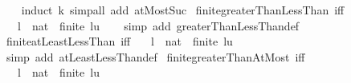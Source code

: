\begin{isabellebody}
%
\isadelimproof
\ \ %
\endisadelimproof
%
\isatagproof
{}\isamarkupfalse%
\ {\isacharparenleft}{\kern0pt}induct\ k{\isacharparenright}{\kern0pt}\ {\isacharparenleft}{\kern0pt}simp{\isacharunderscore}{\kern0pt}all\ add{\isacharcolon}{\kern0pt}\ atMost{\isacharunderscore}{\kern0pt}Suc{\isacharparenright}{\kern0pt}%
\endisatagproof
{\isafoldproof}%
%
\isadelimproof
\isanewline
%
\endisadelimproof
\isanewline
{}\isamarkupfalse%
\ finite{\isacharunderscore}{\kern0pt}greaterThanLessThan\ {\isacharbrackleft}{\kern0pt}iff{\isacharbrackright}{\kern0pt}{\isacharcolon}{\kern0pt}\isanewline
\ \ \ l\ {\isacharcolon}{\kern0pt}{\isacharcolon}{\kern0pt}\ nat\ \ {\isachardoublequoteopen}finite\ {\isacharbraceleft}{\kern0pt}l{\isacharless}{\kern0pt}{\isachardot}{\kern0pt}{\isachardot}{\kern0pt}{\isacharless}{\kern0pt}u{\isacharbraceright}{\kern0pt}{\isachardoublequoteclose}\isanewline
%
\isadelimproof
\ \ %
\endisadelimproof
%
\isatagproof
{}\isamarkupfalse%
\ {\isacharparenleft}{\kern0pt}simp\ add{\isacharcolon}{\kern0pt}\ greaterThanLessThan{\isacharunderscore}{\kern0pt}def{\isacharparenright}{\kern0pt}%
\endisatagproof
{\isafoldproof}%
%
\isadelimproof
\isanewline
%
\endisadelimproof
\isanewline
{}\isamarkupfalse%
\ finite{\isacharunderscore}{\kern0pt}atLeastLessThan\ {\isacharbrackleft}{\kern0pt}iff{\isacharbrackright}{\kern0pt}{\isacharcolon}{\kern0pt}\isanewline
\ \ \ l\ {\isacharcolon}{\kern0pt}{\isacharcolon}{\kern0pt}\ nat\ \ {\isachardoublequoteopen}finite\ {\isacharbraceleft}{\kern0pt}l{\isachardot}{\kern0pt}{\isachardot}{\kern0pt}{\isacharless}{\kern0pt}u{\isacharbraceright}{\kern0pt}{\isachardoublequoteclose}\isanewline
%
\isadelimproof
\ \ %
\endisadelimproof
%
\isatagproof
{}\isamarkupfalse%
\ {\isacharparenleft}{\kern0pt}simp\ add{\isacharcolon}{\kern0pt}\ atLeastLessThan{\isacharunderscore}{\kern0pt}def{\isacharparenright}{\kern0pt}%
\endisatagproof
{\isafoldproof}%
%
\isadelimproof
\isanewline
%
\endisadelimproof
\isanewline
{}\isamarkupfalse%
\ finite{\isacharunderscore}{\kern0pt}greaterThanAtMost\ {\isacharbrackleft}{\kern0pt}iff{\isacharbrackright}{\kern0pt}{\isacharcolon}{\kern0pt}\isanewline
\ \ \ l\ {\isacharcolon}{\kern0pt}{\isacharcolon}{\kern0pt}\ nat\ \ {\isachardoublequoteopen}finite\ {\isacharbraceleft}{\kern0pt}l{\isacharless}{\kern0pt}{\isachardot}{\kern0pt}{\isachardot}{\kern0pt}u{\isacharbraceright}{\kern0pt}{\isachardoublequoteclose}\isanewline

\end{isabellebody}
